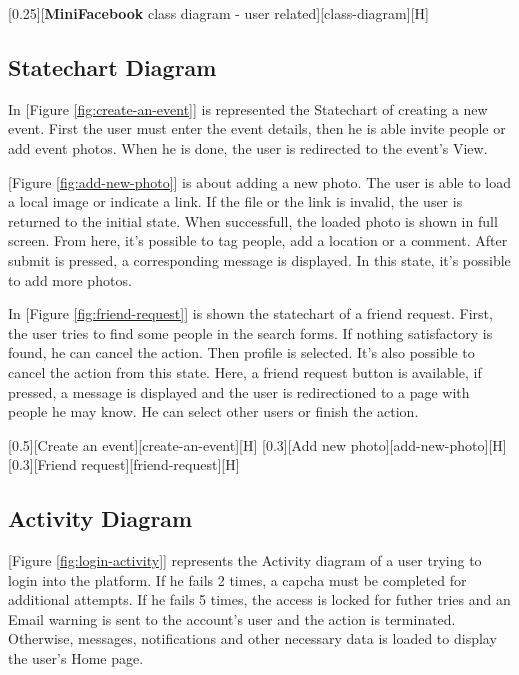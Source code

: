 \documentclass{article}
\begin{document}
			[0.25][\textbf{MiniFacebook} class diagram - user related][class-diagram][H]

		\subsection{Statechart Diagram}
			In [Figure \ref{fig:create-an-event}] is represented the Statechart of creating a new event. First the user must enter the event details, then he is able invite people or add event photos. When he is done, the user is redirected to the event's View.

			\bigskip
			[Figure \ref{fig:add-new-photo}] is about adding a new photo. The user is able to load a local image or indicate a link. If the file or the link is invalid, the user is returned to the initial state. When successfull, the loaded photo is shown in full screen. From here, it's possible to tag people, add a location or a comment. After submit is pressed, a corresponding message is displayed. In this state, it's possible to add more photos.
			
			\bigskip
			In [Figure \ref{fig:friend-request}] is shown the statechart of a friend request. First, the user tries to find some people in the search forms. If nothing satisfactory is found, he can cancel the action. Then profile is selected. It's also possible to cancel the action from this state. Here, a friend request button is available, if pressed, a message is displayed and the user is redirectioned to a page with people he may know. He can select other users or finish the action.

			[0.5][Create an event][create-an-event][H]
			[0.3][Add new photo][add-new-photo][H]
			[0.3][Friend request][friend-request][H]

		\subsection{Activity Diagram}
			[Figure \ref{fig:login-activity}] represents the Activity diagram of a user trying to login into the platform. If he fails 2 times, a capcha must be completed for additional attempts. If he fails 5 times, the access is locked for futher tries and an Email warning is sent to the account's user and the action is terminated. Otherwise, messages, notifications and other necessary data is loaded to display the user's Home page.
\end{document}
